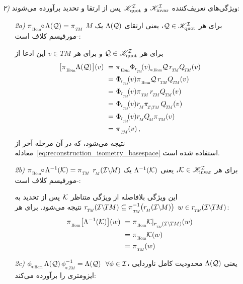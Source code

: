 \begin{itemize}[leftmargin=0cm]
\begin{itemize}[leftmargin=1.1cm]
	\end{itemize}
	
	
	
	
	
	
	
	\item[] {\emph{۲)} ویژگی‌های تعریف‌کننده $\mathscr{K}_\textup{invar}^{\mathcal{I}}$ و $\mathscr{K}_\textup{quot}^{\mathcal{I}}$ پس از ارتقا و تحدید برآورده می‌شوند: }
	
	\begin{itemize}[leftmargin=1.1cm]
		\setlength\itemsep{2ex}
		\item[\textit{2a)}]
		$\piHom \mkern-5mu\circ\mkern-2mu \Lambda(\Q) = \piTM$ برای هر $\mathcal{Q} \in \mathscr{K}_\textup{quot}^{\mathcal{I}}$،
		یعنی ارتقای $\Lambda(\mathcal{Q})$ یک $M$-مورفیسم کلاف است:
		
		برای هر $\mathcal{Q}\in \mathscr{K}_\textup{quot}^{\mathcal{I}}$ و برای هر $v\in TM$ این ادعا از
		\begin{align}
			\big[ \piHom \Lambda(\Q) \big](v)
			\ =&\ \piHom \dPhirHom{v} \Q\, \rTM \QTM(v) \notag \\
			\ =&\ \Phir{v} \piHom \Q\, \rTM \QTM(v) \notag \\
			\ =&\ \Phir{v} \piTM\, \rTM \QTM(v) \notag \\
			\ =&\ \Phir{v} \rM \piITM\, \QTM(v) \notag \\
			\ =&\ \Phir{v} \rM \QM \piTM(v) \notag \\
			\ =&\ \piTM(v) \,,
		\end{align}
		نتیجه می‌شود، که در آن مرحله آخر از معادله~\eqref{eq:reconstruction_isometry_basespace} استفاده شده است.
		
		\item[\textit{2b)}]
		${\piHom \mkern-5mu\circ\mkern-2mu \Lambda^{-1}(\K) = \piTM}$ برای هر $\mathcal{K} \in \mathscr{K}_\textup{invar}^{\mathcal{I}}$،
		یعنی $\Lambda^{-1}(\mathcal{K})$ یک $\rM(\IM)$-مورفیسم کلاف است:
		
		این ویژگی بلافاصله از ویژگی متناظر $\mathcal{K}$ پس از تحدید به $\rTM(\ITM) \subseteq \piTM^{-1}\big(\rM(\IM)\big)$ نتیجه می‌شود.
		برای هر $w \in \rTM(\ITM)$:
		\begin{align}
			\piHom \big[ \Lambda^{-1}(\K) \big](w)
			\ =&\ \piHom \Krestr(w) \notag \\
			\ =&\ \piHom \K(w) \notag \\
			\ =&\ \piTM(w) \notag \\
		\end{align}
		
		\item[\textit{2c)}]
		$\dphiHom \Lambda(\Q)\, \dphiTMinv = \Lambda(\Q)\ \ \forall \phi \in \I$،
		یعنی $\Lambda(\mathcal{Q})$ محدودیت کامل ناوردایی ایزومتری را برآورده می‌کند:
		

\end{itemize}
\end{itemize}
